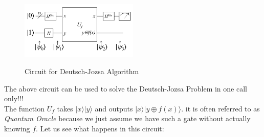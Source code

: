 \begin{figure}[h]
\centering
\includegraphics[width=0.5\textwidth]{images/dj.png}
\label{dj algo}
\caption{Circuit for Deutsch-Jozsa Algorithm}
\end{figure}
The above circuit can be used to solve the Deutsch-Jozsa Problem in one call only!!!\\
The function $U_f$ takes $|x\rangle |y\rangle$ and outputs $|x\rangle |y \oplus f(x)\rangle$. it is often referred to as \textit{Quantum Oracle} because we just assume we have such a gate without actually knowing $f$. Let us see what happens in this circuit:
